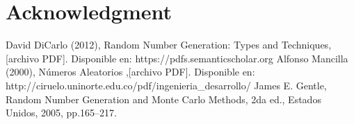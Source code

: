 \documentclass[conference,a4paper]{IEEEtran}
\begin{document}
\section*{Acknowledgment}



\begin{thebibliography}{00}
 David DiCarlo (2012), Random Number Generation: Types and Techniques, [archivo PDF]. Disponible en: https://pdfs.semanticscholar.org
 Alfonso Mancilla (2000), N\'umeros Aleatorios ,[archivo PDF]. Disponible en: http://ciruelo.uninorte.edu.co/pdf/ingenieria\_desarrollo/
 James E. Gentle, Random Number Generation and Monte Carlo Methods, 2da ed., Estados Unidos, 2005, pp.165--217.

\end{thebibliography}
\vspace{12pt}
\end{document}
